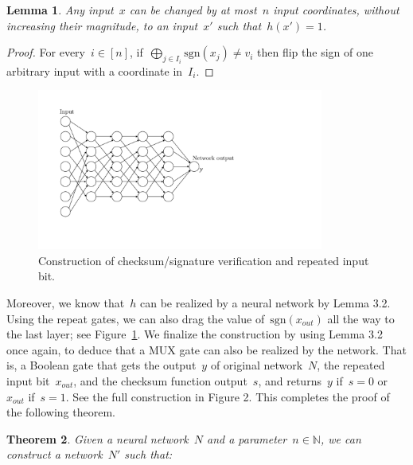 \documentclass[preprint,11pt]{elsarticle}
\newtheorem{theorem}{Theorem}[section]
\newtheorem{lemma}[theorem]{Lemma}
\newcommand{\N}{\mathbb{N}}
\begin{document}
\begin{lemma}
Any input~${x}$ can be changed by at most~$n$ input coordinates, without increasing their magnitude, to an input~$x'$ such that~$h(x')=1$.
\end{lemma}
\begin{proof}
  For every~$i\in[n]$, if~$\bigoplus_{j\in I_i} \text{sgn}(x_{j}) \neq v_i$ then flip the sign of one arbitrary input with a coordinate in~$I_i$.
\end{proof}

\begin{figure}
\centering
\includegraphics[page=2, height=150pt, trim = 100pt 120pt 400pt 100pt]{nn.pdf}
\caption{Construction of checksum/signature verification and repeated input bit.}
\label{fig:checksum}
\end{figure}

Moreover, we know that~$h$ can be realized by a neural network by Lemma 3.2.
Using the repeat gates, we can also drag the value of~$\text{sgn}(x_{out})$ all the way to the last layer; see Figure~\ref{fig:checksum}.
We finalize the construction by using Lemma 3.2 once again, to deduce that a MUX gate can also be realized by the network.
That is, a Boolean gate that gets the output~$y$ of original network~$N$, the repeated input bit~$x_{out}$, and the checksum function output~$s$, and returns~$y$ if~$s=0$ or~$x_{out}$ if~$s=1$. 
See the full construction in Figure 2.
This completes the proof of the following theorem.

\begin{theorem}\label{thm:simpleconst}
 Given a neural network~$N$ and a parameter~$n\in \N$, we can construct a network~$N'$ such that:
\end{theorem}
\end{document}
